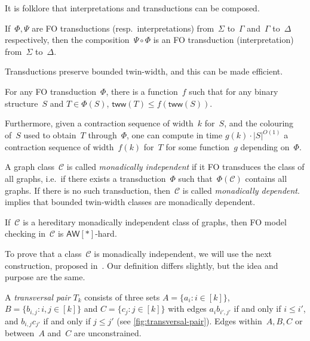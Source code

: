 \documentclass[a4paper,UKenglish,cleveref,thm-restate]{lipics-v2021}
\theoremstyle{remark}
\newcommand{\Cc}{\mathcal{C}}
\newcommand{\tww}{\mathsf{tww}}
\newcommand{\aw}{\ensuremath{\mathsf{AW}[*]}\xspace}
\begin{document}
It is folklore that interpretations and transductions can be composed.
\begin{lemma}
    \label{lem:transduction-comp}
    If~$\Phi,\Psi$ are FO transductions (resp.\ interpretations) from~$\Sigma$ to~$\Gamma$ and~$\Gamma$ to~$\Delta$ respectively,
    then the composition~$\Psi \circ \Phi$ is an FO transduction (interpretation) from~$\Sigma$ to~$\Delta$.
\end{lemma}

Transductions preserve bounded twin-width, and this can be made efficient.
\begin{theorem}\label{thm:tww-transduction}
    For any FO transduction~$\Phi$, there is a function~$f$ such that
    for any binary structure~$S$ and $T \in \Phi(S)$, $\tww(T) \le f(\tww(S))$.

    Furthermore, given a contraction sequence of width~$k$ for~$S$, and the colouring of~$S$ used to obtain~$T$ through~$\Phi$, one can compute in time $g(k) \cdot |S|^{O(1)}$ a contraction sequence of width~$f(k)$ for~$T$ for some function~$g$ depending on~$\Phi$.
\end{theorem}

A graph class~$\Cc$ is called \emph{monadically independent} if it FO transduces the class of all graphs, i.e.\ if there exists a transduction~$\Phi$ such that~$\Phi(\Cc)$ contains all graphs.
If there is no such transduction, then~$\Cc$ is called \emph{monadically dependent}.
 implies that bounded twin-width classes are monadically dependent.

\begin{theorem}\label{thm:independent-hardness}
    If~$\Cc$ is a hereditary monadically independent class of graphs,
    then FO model checking in~$\Cc$ is \aw-hard.
\end{theorem}

To prove that a class~$\Cc$ is monadically independent, we will use the next construction, proposed in~\cite{bonnet2022delineation}.
Our definition differs slightly, but the idea and purpose are the same.
\begin{definition}\label{def:transversal-pair}
A \emph{transversal pair} $T_k$ consists of three sets $A = \{a_i : i \in [k]\}$, $B = \{b_{i, j} : i, j \in [k]\}$ and $C = \{c_j: j \in [k]\}$ 
with edges $a_i b_{i',j'}$ if and only if $i \le i'$, and $b_{i,j} c_{j'}$ if and only if $j \le j'$ (see \cref{fig:transversal-pair}).
Edges within~$A,B,C$ or between~$A$ and~$C$ are unconstrained.
\end{definition}
\end{document}
